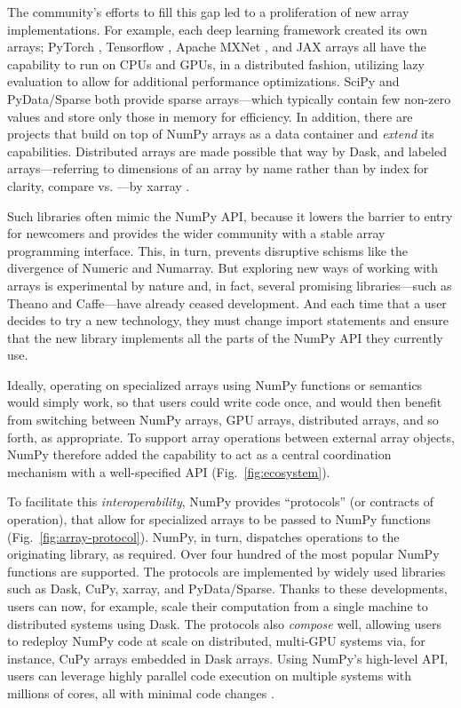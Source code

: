 The community's efforts to fill this gap led to a
proliferation of new array implementations. For example, each deep learning framework created
its own arrays; PyTorch \cite{NEURIPS2019_9015},
Tensorflow \cite{abadi2016tensorflow}, Apache MXNet \cite{chen2015mxnet},
and JAX arrays all have the
capability to run on CPUs and GPUs, in a distributed fashion, utilizing lazy evaluation
to allow for additional performance optimizations.  SciPy and PyData/Sparse both
provide sparse arrays---which typically contain few non-zero values and store
only those in memory for efficiency.
In addition, there are projects that build on top of NumPy arrays as a data
container and \textit{extend} its capabilities.  Distributed arrays are
made possible that way by Dask, and labeled arrays---referring to dimensions of
an array by name rather than by index for clarity, compare  vs.
---by xarray \cite{hoyer2017xarray}.

Such libraries often mimic the NumPy API, because it lowers the
barrier to entry for newcomers and provides the wider community with a
stable array programming interface. This, in turn, prevents disruptive
schisms like the divergence of Numeric and Numarray.
But exploring new ways of working with arrays is experimental by nature
and, in fact, several promising libraries---such as Theano and Caffe---have
already ceased development. And each time that a user
decides to try a new technology, they must
change import statements and ensure that the new library implements
all the parts of the NumPy API they currently use.

Ideally, operating on specialized arrays using NumPy functions or semantics would
simply work, so that users could write code once, and would then benefit
from switching between NumPy arrays, GPU arrays, distributed arrays,
and so forth, as appropriate.
To support array operations between external array objects, NumPy
therefore added the capability to act as a central coordination
mechanism with a well-specified API (Fig.~\ref{fig:ecosystem}).

To facilitate this \emph{interoperability}, NumPy provides
``protocols'' (or contracts of operation), that allow for specialized arrays to be
passed to NumPy functions (Fig.~\ref{fig:array-protocol}).
NumPy, in turn, dispatches operations to the originating library, as required.
Over four hundred of the most popular
NumPy functions are supported.
The protocols are implemented by widely used libraries such as Dask, CuPy,
xarray, and PyData/Sparse.
Thanks to these developments, users can now, for example, scale
their computation from a single machine to distributed systems using Dask.
The protocols also \textit{compose} well, allowing users to redeploy NumPy
code at scale on distributed, multi-GPU systems via, for instance, CuPy arrays embedded in Dask
arrays. Using NumPy's high-level API, users can leverage highly parallel code
execution on multiple systems with millions of cores, all with minimal code
changes \cite{entschev2019}.

